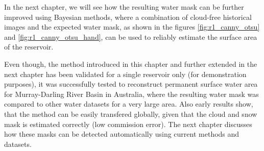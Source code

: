 In the next chapter, we will see how the resulting water mask can be further improved using Bayesian methods, where a combination of cloud-free historical images and the expected water mask, as shown in the figures \ref{fig:r1_canny_otsu} and \ref{fig:r1_canny_otsu_hand}, can be used to reliably estimate the surface area of the reservoir.

Even though, the method introduced in this chapter and further extended in the next chapter has been validated for a single reservoir only (for demonstration purposes), it was successfully tested to reconstruct permanent surface water area for Murray-Darling River Basin in Australia, where the resulting water mask was compared to other water datasets for a very large area. Also early results show, that the method can be easily transfered globally, given that the cloud and snow mask is estimated correctly (low commission error). The next chapter discusses how these masks can be detected automatically using current methods and datasets.


